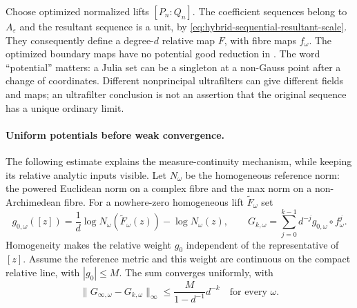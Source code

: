 Choose optimized normalized lifts $[P_n:Q_n]$. The coefficient sequences
belong to $A_{\varepsilon}$ and the resultant sequence is a unit, by
\eqref{eq:hybrid-sequential-resultant-scale}. They consequently define
a degree-$d$ relative map $F$, with fibre maps $f_\omega$.
The optimized boundary maps have no potential good reduction in
\cite[Theorem~3.17]{FavreGong26SequentialV4}. The word ``potential''
matters: a Julia set can be a singleton at a non-Gauss point after
a change of coordinates. Different nonprincipal ultrafilters can
give different fields and maps; an ultrafilter conclusion is not
an assertion that the original sequence has a unique ordinary limit.

\paragraph{Uniform potentials before weak convergence.}
The following estimate explains the measure-continuity mechanism,
while keeping its relative analytic inputs visible. Let $N_\omega$
be the homogeneous reference norm: the powered Euclidean norm on
a complex fibre and the max norm on a non-Archimedean fibre. For a
nowhere-zero homogeneous lift $\widetilde F_\omega$ set
\[
 g_{0,\omega}([z])=
       \frac1d\log N_\omega(\widetilde F_\omega(z))
                          -\log N_\omega(z),\qquad
 G_{k,\omega}=\sum_{j=0}^{k-1}d^{-j}g_{0,\omega}\circ f_\omega^j.
\tag{66.29o}\label{eq:hybrid-sequential-Green-sum}
\]
Homogeneity makes the relative weight $g_0$ independent of the
representative of $[z]$. Assume the reference metric and this weight
are continuous on the compact relative line, with $|g_0|\leq M$.
The sum converges uniformly, with
\[
 \|G_{\infty,\omega}-G_{k,\omega}\|_\infty
                 \leq\frac{M}{1-d^{-1}}d^{-k}
                  \quad\text{for every }\omega.
\tag{66.29p}\label{eq:hybrid-sequential-Green-tail}
\]

